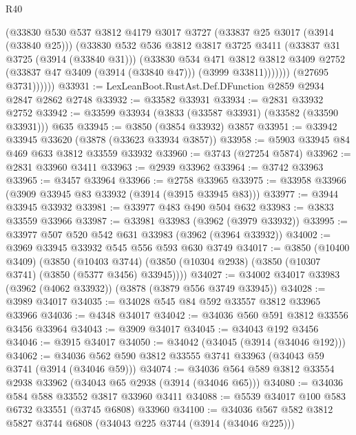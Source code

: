 \begin{lexlean}{R40}
\begin{coremodule}
                    (@33830
                      @530
                      @537
                      @3812
                      @4179
                      @3017
                      @3727
                      (@33837 @25 @3017 (@3914 (@33840 @25)))
                      (@33830
                        @532
                        @536
                        @3812
                        @3817
                        @3725
                        @3411
                        (@33837 @31 @3725 (@3914 (@33840 @31)))
                        (@33830
                          @534
                          @471
                          @3812
                          @3812
                          @3409
                          @2752
                          (@33837 @47 @3409 (@3914 (@33840 @47)))
                          (@3999 @33811)))))))
              (@27695 @3731))))))
@33931 := LexLeanBoot.RustAst.Def.DFunction @2859 @2934 @2847 @2862 @2748
@33932 := @33582 @33931
@33934 := @2831 @33932 @2752
@33942 := @33599 @33934 (@3833 (@33587 @33931) (@33582 (@33590 @33931))) @635
@33945 := @3850 (@3854 @33932) @3857
@33951 := @33942 @33945 @33620 (@3878 (@33623 @33934 @3857))
@33958 := @5903 @33945 @84 @469 @633 @3812 @33559 @33932
@33960 := @3743 (@27254 @5874)
@33962 := @2831 @33960 @3411
@33963 := @2939 @33962
@33964 := @3742 @33963
@33965 := @3457 @33964
@33966 := @2758 @33965
@33975 := @33958 @33966 (@3909 @33945 @83 @33932 (@3914 (@3915 @33945 @83)))
@33977 := @3944 @33945 @33932
@33981 := @33977 @483 @490 @504 @632
@33983 := @3833 @33559 @33966
@33987 := @33981 @33983 (@3962 (@3979 @33932))
@33995 := @33977 @507 @520 @542 @631 @33983 (@3962 (@3964 @33932))
@34002 := @3969 @33945 @33932 @545 @556 @593 @630 @3749
@34017 := @3850
    (@10400 @3409)
    (@3850
      (@10403 @3744)
      (@3850 (@10304 @2938) (@3850 (@10307 @3741) (@3850 (@5377 @3456) @33945))))
@34027 := @34002 @34017 @33983 (@3962 (@4062 @33932)) (@3878 (@3879 @556 @3749 @33945))
@34028 := @3989 @34017
@34035 := @34028 @545 @84 @592 @33557 @3812 @33965 @33966
@34036 := @4348 @34017
@34042 := @34036 @560 @591 @3812 @33556 @3456 @33964
@34043 := @3909 @34017
@34045 := @34043 @192 @3456
@34046 := @3915 @34017
@34050 := @34042 (@34045 (@3914 (@34046 @192)))
@34062 := @34036 @562 @590 @3812 @33555 @3741 @33963 (@34043 @59 @3741 (@3914 (@34046 @59)))
@34074 := @34036 @564 @589 @3812 @33554 @2938 @33962 (@34043 @65 @2938 (@3914 (@34046 @65)))
@34080 := @34036 @584 @588 @33552 @3817 @33960 @3411
@34088 := @5539 @34017 @100 @583 @6732 @33551 (@3745 @6808) @33960
@34100 := @34036 @567 @582 @3812 @5827 @3744 @6808 (@34043 @225 @3744 (@3914 (@34046 @225)))

\end{coremodule}
\end{lexlean}
